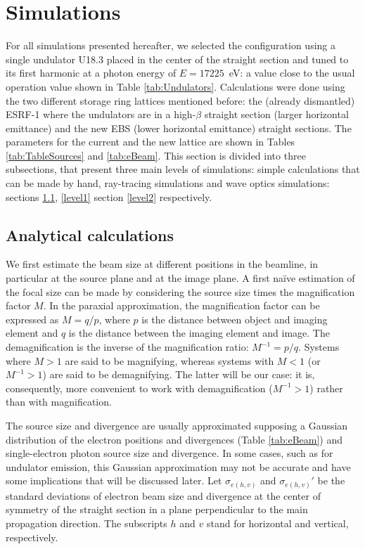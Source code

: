\documentclass{iucr}              %
\begin{document}
\section{Simulations}
\label{Simulations}

For all simulations presented hereafter, we selected the configuration using a single undulator U18.3 placed in the center of the straight section and tuned to its first harmonic at a photon energy of $E=17225$~eV: a value close to the usual operation value shown in Table \ref{tab:Undulators}. Calculations were done using the two different storage ring lattices mentioned before: the (already dismantled) ESRF-1 where the undulators are in a high-$\beta$ straight section (larger horizontal emittance) and the new EBS (lower horizontal emittance) straight sections. The parameters for the current and the new lattice are shown in Tables \ref{tab:TableSources} and \ref{tab:eBeam}.
This section is divided into three subsections, that present three main levels of simulations: simple calculations that can be made by hand, ray-tracing simulations and wave optics simulations: sections  \ref{level0}, \ref{level1} section \ref{level2} respectively.   

\subsection{Analytical calculations}
\label{level0}

We first estimate the beam size at different positions in the beamline, in particular at the source plane and at the image plane. A first na{\"{i}}ve estimation of the focal size can be made by considering the source size times the magnification factor $M$. In the paraxial approximation, the magnification factor can be expressed as $M=q/p$, where $p$ is the distance between object and imaging element and $q$ is the distance between the imaging element and image. The demagnification is the inverse of the magnification ratio: $M^{-1}=p/q$. Systems where $M>1$ are said to be magnifying, whereas systems with $M<1$ (or $M^{-1}>1$) are said to be demagnifying. The latter will be our case: it is, consequently, more convenient to work with demagnification ($M^{-1}>1$) rather than with magnification. 

The source size and divergence are usually approximated supposing a Gaussian distribution of the electron positions and divergences (Table \ref{tab:eBeam}) and single-electron photon source size and divergence. In some cases, such as for undulator emission, this Gaussian approximation may not be accurate and have some implications that will be discussed later. Let $\sigma_{e(h,v)}$ and $\sigma_{e(h,v)}'$ be the standard deviations of electron beam size and divergence at the center of symmetry of the straight section in a plane perpendicular to the main propagation direction. The subscripts $h$ and $v$ stand for horizontal and vertical, respectively. 
\end{document}
